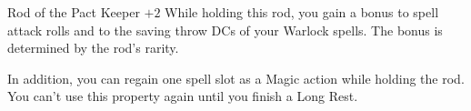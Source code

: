 \begin{Card}{Rod of the Pact Keeper $+2$}
  While holding this rod, you gain a bonus to spell attack rolls and to the saving throw DCs of your Warlock spells. The bonus is determined by the rod's rarity.

In addition, you can regain one spell slot as a Magic action while holding the rod. You can't use this property again until you finish a Long Rest.
\end{Card}


